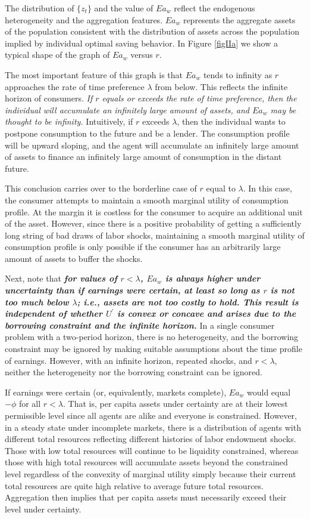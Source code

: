 \documentclass[12pt]{article}
\theoremstyle{definition}
\begin{document}
The distribution of $\{z_t\}$ and the value of $Ea_w$ reflect the endogenous heterogeneity and the aggregation features. $Ea_w$ represents the aggregate assets of the population consistent with the distribution of assets across the population implied by individual optimal saving behavior. In Figure \ref{figIIa} we show a typical shape of the graph of $Ea_w$ versus $r$.

The most important feature of this graph is that $Ea_w$ tends to infinity as $r$ approaches the rate of time preference $\lambda$ from below. This reflects the infinite horizon of consumers. \emph{If $r$ equals or exceeds the rate of time preference, then the individual will accumulate an infinitely large amount of assets, and $Ea_w$ may be thought to be infinity.} Intuitively, if $r$ exceeds $\lambda$, then the individual wants to postpone consumption to the future and be a lender. The consumption profile will be upward sloping, and the agent will accumulate an infinitely large amount of assets to finance an infinitely large amount of consumption in the distant future. 

This conclusion carries over to the borderline case of $r$ equal to $\lambda$. In this case, the consumer attempts to maintain a smooth marginal utility of consumption profile. At the margin it is costless for the consumer to acquire an additional unit of the asset. However, since there is a positive probability of getting a sufficiently long string of bad draws of labor shocks, maintaining a smooth marginal utility of consumption profile is only possible if the consumer has an arbitrarily large amount of assets to buffer the shocks.

Next, note that \emph{\bf for values of $r < \lambda$, $Ea_w$ is always higher under uncertainty than if earnings were certain, at least so long as $r$ is not too much below $\lambda$; i.e., assets are not too costly to hold. This result is independent of whether $U^{\prime}$ is convex or concave and arises due to the borrowing constraint and the infinite horizon.} In a single consumer problem with a two-period horizon, there is no heterogeneity, and the borrowing constraint may be ignored by making suitable assumptions about the time profile of earnings. However, with an infinite horizon, repeated shocks, and $r < \lambda$, neither the heterogeneity nor the borrowing constraint can be ignored.

If earnings were certain (or, equivalently, markets complete), $Ea_w$ would equal $-\phi$ for all $r < \lambda$. That is, per capita assets under certainty are at their lowest permissible level since all agents are alike and everyone is constrained. However, in a steady state under incomplete markets, there is a distribution of agents with different total resources reflecting different histories of labor endowment shocks. Those with low total resources will continue to be liquidity constrained, whereas those with high total resources will accumulate assets beyond the constrained level regardless of the convexity of marginal utility simply because their current total resources are quite high relative to average future total resources. Aggregation then implies that per capita assets must necessarily exceed their level under certainty.
\end{document}
